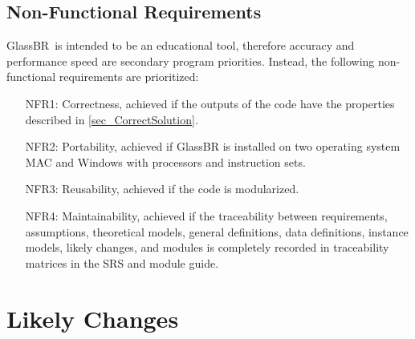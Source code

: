 \documentclass[12pt]{article}
\newcommand{\progname}{GlassBR}
\begin{document}
\subsection{Non-Functional Requirements}

\progname\ is intended to be an educational tool, therefore accuracy and
performance speed are secondary program priorities. Instead, the following 
non-functional requirements are prioritized:

\begin{itemize}
\item[NFR1:] Correctness, achieved if the outputs of the code have the 
properties described 
in \ref{sec_CorrectSolution}.
\item[NFR2:] Portability, achieved if \progname{} is installed on two operating system MAC and Windows with processors and instruction sets.
 
\item[NFR3:] Reusability, achieved if the code is modularized.
\item[NFR4:] Maintainability, achieved if the traceability between 
requirements, assumptions, theoretical models, general definitions, data 
definitions, instance models, likely changes, and modules is completely 
recorded in traceability matrices in the SRS and module guide.
\end{itemize}

\section{Likely Changes} \label{sec_like}
\end{document}

